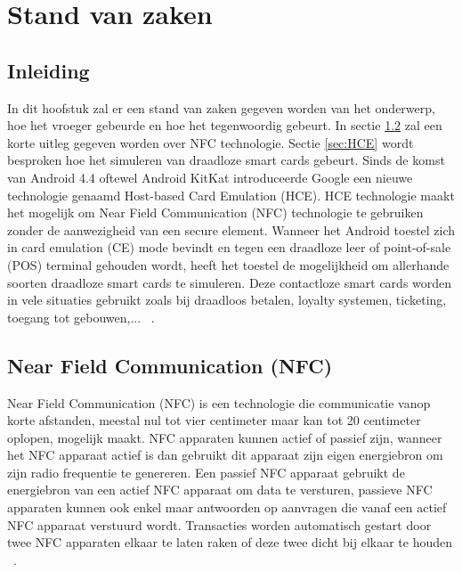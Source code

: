 \chapter{Stand van zaken}
\label{ch:stand-van-zaken}



\section{Inleiding}

In dit hoofstuk zal er een stand van zaken gegeven worden van het onderwerp, hoe het vroeger gebeurde en hoe het tegenwoordig gebeurt. In sectie \ref{sec:NFC} zal een korte uitleg gegeven worden over NFC technologie. Sectie \ref{sec:HCE} wordt besproken hoe het simuleren van draadloze smart cards gebeurt. 
Sinds de komst van Android 4.4 oftewel Android KitKat introduceerde Google een nieuwe technologie genaamd Host-based Card Emulation (HCE). HCE technologie maakt het mogelijk om Near Field Communication (NFC) technologie te gebruiken zonder de aanwezigheid van een secure element. 
Wanneer het Android toestel zich in card emulation (CE) mode bevindt en tegen een draadloze leer of point-of-sale (POS) terminal gehouden wordt, heeft het toestel de mogelijkheid om allerhande soorten draadloze smart cards te simuleren. Deze contactloze smart cards worden in vele situaties gebruikt zoals bij draadloos betalen, loyalty systemen, ticketing, toegang tot gebouwen,... ~\autocite{SCA2014}.

\section{Near Field Communication (NFC)}
\label{sec:NFC}
Near Field Communication (NFC) is een technologie die communicatie vanop korte afstanden, meestal nul tot vier centimeter maar kan tot 20 centimeter oplopen, mogelijk maakt. NFC apparaten kunnen actief of passief zijn, wanneer het NFC apparaat actief is dan gebruikt dit apparaat zijn eigen energiebron om zijn radio frequentie te genereren. Een passief NFC apparaat gebruikt de energiebron van een actief NFC apparaat om data te versturen, passieve NFC apparaten kunnen ook enkel maar antwoorden op aanvragen die vanaf een actief NFC apparaat verstuurd wordt. Transacties worden automatisch gestart door twee NFC apparaten elkaar te laten raken of deze twee dicht bij elkaar te houden ~\autocite{Alattar2014}. 

